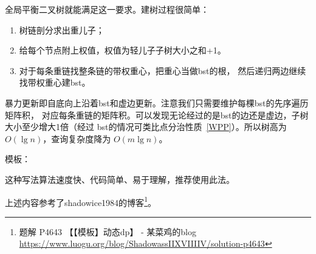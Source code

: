 全局平衡二叉树就能满足这一要求。建树过程很简单：
\begin{enumerate}
    \item 树链剖分求出重儿子；
    \item 给每个节点附上权值，权值为轻儿子子树大小之和+1。
    \item 对于每条重链找整条链的带权重心，把重心当做bst的根，
    然后递归两边继续找带权重心建bst。
\end{enumerate}

暴力更新即自底向上沿着bst和虚边更新。注意我们只需要维护每棵bst的先序遍历矩阵积，
对应每条重链的矩阵积。可以发现无论经过的是bst的边还是虚边，子树大小至少增大1倍（经过
bst的情况可类比点分治性质~\ref{WPP}）。所以树高为$O(\lg n)$，查询复杂度降为
$O(m\lg n)$。

模板：


这种写法算法速度快、代码简单、易于理解，推荐使用此法。

上述内容参考了shadowice1984的博客\footnote{
    题解 P4643 【【模板】动态dp】 - 某菜鸡的blog\\
    \url{https://www.luogu.org/blog/ShadowassIIXVIIIIV/solution-p4643}
}。
